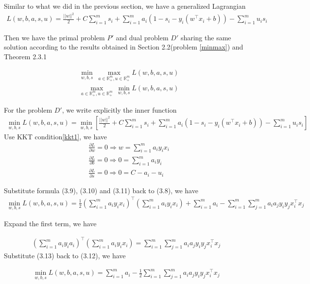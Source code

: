 \documentclass[a4paper]{report}
\begin{document}
Similar to what we did in the previous section, we have a generalized Lagrangian
\begin{align}
    L(w,b,a,s,u) = \frac{||w||^2}{2}+C\sum_{i=1}^m s_i + \sum_{i=1}^m a_i(1-s_i-y_i(w^\top x_i + b)) - \sum_{i=1}^m u_i s_i
\end{align}

Then we have the primal problem $P'$ and dual problem $D'$ sharing the same solution according to the results obtained in Section 2.2(problem \ref{minmax}) and Theorem 2.3.1

\begin{align}
    &\min_{w,b,s} \ \max_{a\in\mathbb R_+^m,u\in\mathbb R_+^m} L(w,b,a,s,u) \tag{P'}\\
    &\max_{a\in\mathbb R_+^m,u\in\mathbb R_+^m} \ \min_{w,b,s} L(w,b,a,s,u) \tag{D'}
\end{align}

For the problem $D'$, we write explicitly the inner function
\begin{align}
    \min_{w,b,s} L(w,b,a,s,u)=\min_{w,b,s}[\frac{||w||^2}{2}+C\sum_{i=1}^m s_i + \sum_{i=1}^m a_i(1-s_i-y_i(w^\top x_i + b)) - \sum_{i=1}^m u_i s_i]
\end{align}
Use KKT condition\ref{kkt1}, we have
\begin{align}
    &\frac{\partial L}{\partial w}=0\Rightarrow w=\sum_{i=1}^m a_i y_i x_i\\
    &\frac{\partial L}{\partial b}=0\Rightarrow 0=\sum_{i=1}^m a_i y_i \\
    &\frac{\partial L}{\partial s}=0\Rightarrow 0=C-a_i-u_i
\end{align}

Substitute formula (3.9), (3.10) and (3.11) back to (3.8), we have 
\begin{align}
    \min_{w,b,s} L(w,b,a,s,u) = \frac{1}{2}\left( \sum_{i=1}^m a_i y_i x_i \right)^\top \left( \sum_{i=1}^m a_i y_i x_i\right) + \sum_{i=1}^m a_i - \sum_{i=1}^m\sum_{j=1}^m a_i a_j y_i y_j x_i^\top x_j
\end{align}

Expand the first term, we have 

\begin{align}
    \left( \sum_{i=1}^m a_i y_i a_i \right)^\top \left( \sum_{i=1}^m a_i y_i x_i\right)= \sum_{i=1}^m\sum_{j=1}^m a_i a_j y_i y_j x_i^\top x_j
\end{align}
Substitute (3.13) back to (3.12), we have

\begin{align}
    \min_{w,b,s} L(w,b,a,s,u) = \sum_{i=1}^m a_i - \frac{1}{2} \sum_{i=1}^m\sum_{j=1}^m a_i a_j y_i y_j x_i^\top x_j
\end{align}
\end{document}
